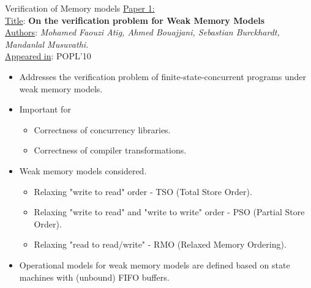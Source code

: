 \documentclass[9pt]{beamer}
\begin{document}
\begin{frame}{Verification of Memory models}
\underline{Paper 1:}\\
\vspace{0.3cm}
\underline{Title}: \textbf{On the verification problem for Weak Memory Models}\\
\underline{Authors}: {\em Mohamed Faouzi Atig, Ahmed Bouajjani, Sebastian Burckhardt, Mandanlal Musuvathi.}\\
\underline{Appeared in}: POPL'10\\
\pause
\vspace{0.3cm}
\begin{itemize}
\item Addresses the verification problem of finite-state-concurrent programs under
      weak memory models.
\pause
\item Important for
	\begin{itemize}
  \item Correctness of concurrency libraries.
  \item Correctness of compiler transformations.
	\end{itemize}
\pause
\item Weak memory models considered.
  \begin{itemize}
  \item Relaxing "write to read" order - TSO (Total Store Order).
  \item Relaxing "write to read" and "write to write" order - PSO (Partial Store Order).
  \item Relaxing "read to read/write" - RMO (Relaxed Memory Ordering).
  \end{itemize}
\pause
\item Operational models for weak memory models are defined based on state
      machines with (unbound) FIFO buffers.
\end{itemize}
\end{frame}
\end{document}
